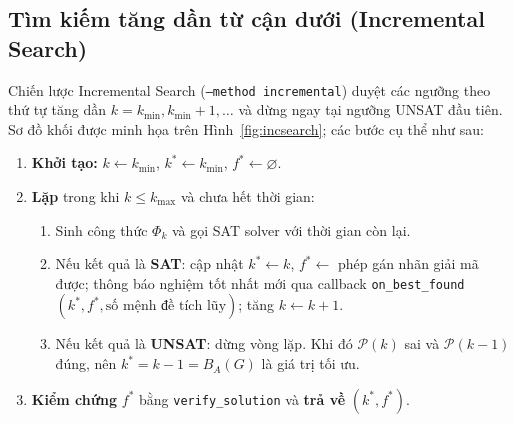 \documentclass[a4paper,fleqn]{cas-sc}
\begin{document}
\subsection{Tìm kiếm tăng dần từ cận dưới (Incremental Search)}
\label{sec:incsearch}
Chiến lược Incremental Search (\texttt{--method incremental}) duyệt các ngưỡng theo thứ tự tăng dần $k = k_{\min}, k_{\min} + 1, \dots$ và dừng ngay tại ngưỡng UNSAT đầu tiên. Sơ đồ khối được minh họa trên Hình~\ref{fig:incsearch}; các bước cụ thể như sau:

\begin{enumerate}
  \item \textbf{Khởi tạo:} $k \leftarrow k_{\min}$, $k^\ast \leftarrow k_{\min}$, $f^\ast \leftarrow \varnothing$.
  \item \textbf{Lặp} trong khi $k \le k_{\max}$ và chưa hết thời gian:
  \begin{enumerate}
    \item Sinh công thức $\Phi_k$ và gọi SAT solver với thời gian còn lại.
    \item Nếu kết quả là \textbf{SAT}: cập nhật $k^\ast \leftarrow k$, $f^\ast \leftarrow$ phép gán nhãn giải mã được; thông báo nghiệm tốt nhất mới qua callback \texttt{on\_best\_found}$(k^\ast, f^\ast, \text{số mệnh đề tích lũy})$; tăng $k \leftarrow k + 1$.
    \item Nếu kết quả là \textbf{UNSAT}: dừng vòng lặp. Khi đó $\mathcal{P}(k)$ sai và $\mathcal{P}(k - 1)$ đúng, nên $k^\ast = k - 1 = B_A(G)$ là giá trị tối ưu.
  \end{enumerate}
  \item \textbf{Kiểm chứng} $f^\ast$ bằng \texttt{verify\_solution} và \textbf{trả về} $(k^\ast, f^\ast)$.
\end{enumerate}
\end{document}
